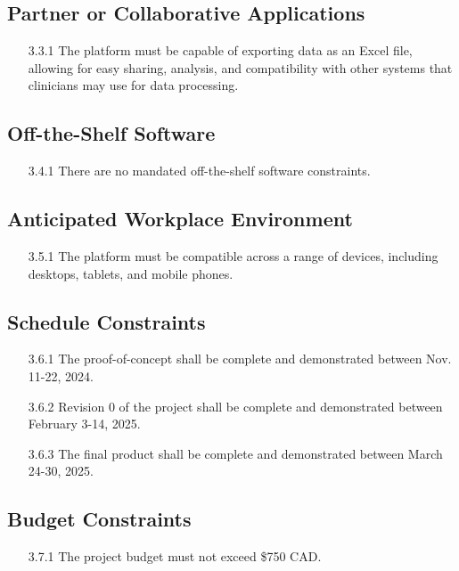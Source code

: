 \documentclass[12pt]{article}
\begin{document}
\subsection{Partner or Collaborative Applications}
\begin{itemize}
  \item[3.3.1] The platform must be capable of exporting data as an Excel file, allowing for easy sharing, analysis, and compatibility with other systems
  that clinicians may use for data processing.
\end{itemize}
\subsection{Off-the-Shelf Software}
\begin{itemize}
  \item[3.4.1] \color{red} There are no mandated off-the-shelf software constraints. \color{black}
\end{itemize}
\subsection{Anticipated Workplace Environment}
\begin{itemize}
  \item[3.5.1] The platform must be compatible across a range of devices, including desktops, tablets, and mobile phones.
\end{itemize}
\subsection{Schedule Constraints}
\begin{itemize}
  \item[3.6.1] The proof-of-concept shall be complete and demonstrated between Nov. 11-22, 2024.
  \item[3.6.2] Revision 0 of the project shall be complete and demonstrated between February 3-14, 2025.
  \item[3.6.3] The final product shall be complete and demonstrated between March 24-30, 2025.
\end{itemize}
\subsection{Budget Constraints}
\begin{itemize}
  \item[3.7.1] The project budget must not exceed \$750 CAD. 
\end{itemize}
\end{document}
